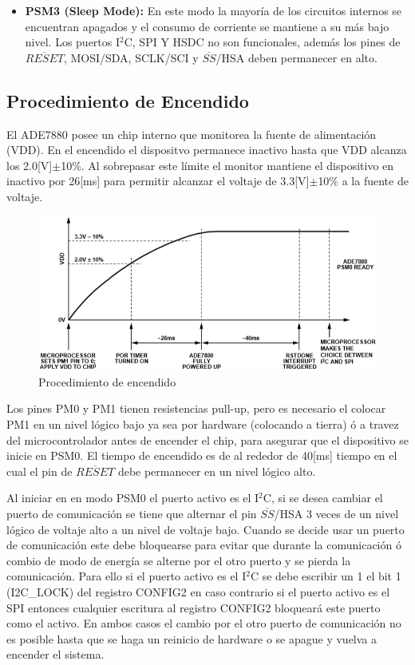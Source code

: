 \documentclass[letterpaper,12pt,oneside]{book}
\begin{document}
\begin{itemize}
				\item \textbf{PSM3 (Sleep Mode):} En este modo la mayoría de los circuitos internos se encuentran apagados y el consumo de corriente se mantiene a su más bajo nivel. Los puertos I$^2$C, SPI Y HSDC no son funcionales, además los pines de $\overline{RESET}$, MOSI/SDA, SCLK/SCI y $\overline{SS}$/HSA deben permanecer en alto.
			\end{itemize}

			\subsection{Procedimiento de Encendido}
			El ADE7880 posee un chip interno que monitorea la fuente de alimentación (VDD). En el encendido el dispositvo permanece inactivo hasta que VDD alcanza los 2.0[V]$\pm$10\%. Al sobrepasar este límite el monitor mantiene el dispositivo en inactivo por 26[ms] para permitir alcanzar el voltaje de 3.3[V]$\pm$10\% a la fuente de voltaje.

			\begin{figure}[!htpb]
				\centering
				\includegraphics[scale = 0.8]{Material de Consulta/Encendido.PNG}
				\caption[Encendido del ADE7880]{Procedimiento de encendido}
				\label{ADEOn}
			\end{figure}

			Los pines PM0 y PM1 tienen resistencias pull-up, pero es necesario el colocar PM1 en un nivel lógico bajo ya sea por hardware (colocando a tierra) ó a travez del microcontrolador antes de encender el chip, para asegurar que el dispositivo se inicie en PSM0. El tiempo de encendido es de al rededor de 40[ms] tiempo en el cual el pin de $\overline{RESET}$ debe permanecer en un nivel lógico alto.

			Al iniciar en en modo PSM0 el puerto activo es el I$^2$C, si se desea cambiar el puerto de comunicación se tiene que alternar el pin $\overline{SS}$/HSA 3 veces de un nivel lógico de voltaje alto a un nivel de voltaje bajo. Cuando se decide usar un puerto de comunicación este debe bloquearse para evitar que durante la comunicación ó combio de modo de energía se alterne por el otro puerto y se pierda la comunicación. Para ello si el puerto activo es el I$^2$C se debe escribir un 1 el bit 1 (I2C\_LOCK) del registro CONFIG2 en caso contrario si el puerto activo es el SPI entonces cualquier escritura al registro CONFIG2 bloqueará este puerto como el activo. En ambos casos el cambio por el otro puerto de comunicación no es posible hasta que se haga un reinicio de hardware o se apague y vuelva a encender el sistema.
\end{document}
